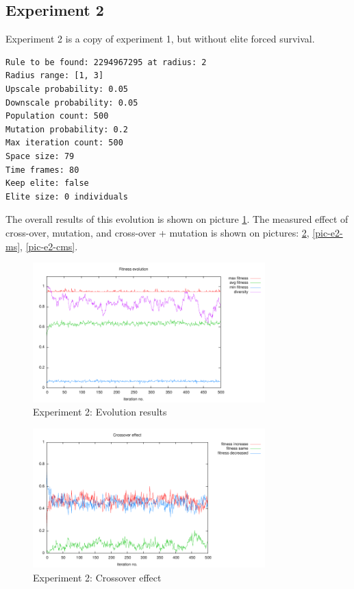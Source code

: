 \documentclass[12pt,a4paper]{article}
\begin{document}
\subsection{Experiment 2}
Experiment 2 is a copy of experiment 1, but without elite forced survival.

\begin{verbatim}
Rule to be found: 2294967295 at radius: 2
Radius range: [1, 3]
Upscale probability: 0.05
Downscale probability: 0.05
Population count: 500
Mutation probability: 0.2
Max iteration count: 500
Space size: 79
Time frames: 80
Keep elite: false
Elite size: 0 individuals
\end{verbatim}

The overall results of this evolution is shown on picture \ref{pic-e2-results}. The measured effect of cross-over, mutation, and cross-over + mutation is shown on pictures: \ref{pic-e2-cs}, \ref{pic-e2-ms}, \ref{pic-e2-cms}.

\begin{figure}
\centering
\includegraphics[width=0.8\textwidth]{results/2/1.pdf}
\caption{Experiment 2: Evolution results}
\label{pic-e2-results}
\end{figure}

\begin{figure}
\centering
\includegraphics[width=0.8\textwidth]{results/2/1-cs.pdf}
\caption{Experiment 2: Crossover effect}
\label{pic-e2-cs}
\end{figure}
\end{document}

